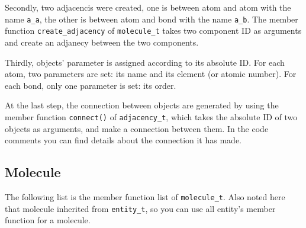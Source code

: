 \documentclass[letterpaper]{book}
\begin{document}
Secondly, two adjacencis were created, one is between atom and atom with the name \lstinline$a_a$, the
other is between atom and bond with the name \lstinline$a_b$. The member function \lstinline$create_adjacency$
of \lstinline$molecule_t$ takes two component ID as arguments and create an adjanecy between the two
components.

Thirdly, objects' parameter is assigned according to its absolute ID. For each atom, two parameters are set:
its name and its element (or atomic number). For each bond, only one parameter is set: its order.

At the last step, the connection between objects are generated by using the member function 
\lstinline$connect()$ 
of \lstinline$adjacency_t$, which takes the absolute ID of two objects as arguments, and make a connection between
them. In the code comments you can find  details about the connection it has made.

\subsection{Molecule}

The following list is the member function list of \lstinline$molecule_t$. Also noted here that molecule inherited from
\lstinline$entity_t$, so you can use all entity's member function for a molecule.
\end{document}
